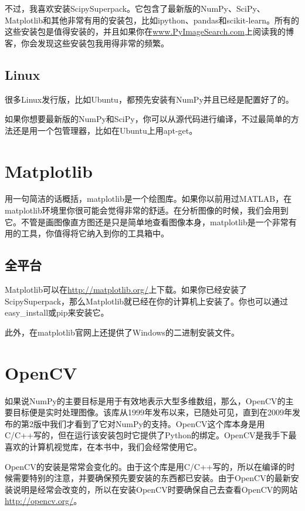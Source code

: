 \documentclass[color=cyan,mathpazo,titlestyle=hang]{elegantbook}
\begin{document}
不过，我喜欢安装ScipySuperpack。它包含了最新版的NumPy、SciPy、Matplotlib和其他非常有用的安装包，比如ipython、pandas和scikit-learn。所有的这些安装包是值得安装的，并且如果你在\url{www.PyImageSearch.com}上阅读我的博客，你会发现这些安装包我用得非常的频繁。

\subsection{Linux}

很多Linux发行版，比如Ubuntu，都预先安装有NumPy并且已经是配置好了的。

如果你想要最新版的NumPy和SciPy，你可以从源代码进行编译，不过最简单的方法还是用一个包管理器，比如在Ubuntu上用apt-get。

\section{Matplotlib}

用一句简洁的话概括，matplotlib是一个绘图库。如果你以前用过MATLAB，在matplotlib环境里你很可能会觉得非常的舒适。在分析图像的时候，我们会用到它。不管是画图像直方图还是只是简单地查看图像本身，matplotlib是一个非常有用的工具，你值得将它纳入到你的工具箱中。

\subsection{全平台}

Matplotlib可以在\url{http://matplotlib.org/}上下载。如果你已经安装了ScipySuperpack，那么Matplotlib就已经在你的计算机上安装了。你也可以通过easy\_install或pip来安装它。

此外，在matplotlib官网上还提供了Windows的二进制安装文件。

\section{OpenCV}

如果说NumPy的主要目标是用于有效地表示大型多维数组，那么，OpenCV的主要目标便是实时处理图像。该库从1999年发布以来，已随处可见，直到在2009年发布的第2版中我们才看到了它对NumPy的支持。OpenCV这个库本身是用C/C++写的，但在运行该安装包时它提供了Python的绑定。OpenCV是我手下最喜欢的计算机视觉库，在本书中，我们会经常使用它。

OpenCV的安装是常常会变化的。由于这个库是用C/C++写的，所以在编译的时候需要特别的注意，并要确保预先要安装的东西都已安装。由于OpenCV的最新安装说明是经常会改变的，所以在安装OpenCV时要确保自己去查看OpenCV的网站\url{http://opencv.org/}。
\end{document}
